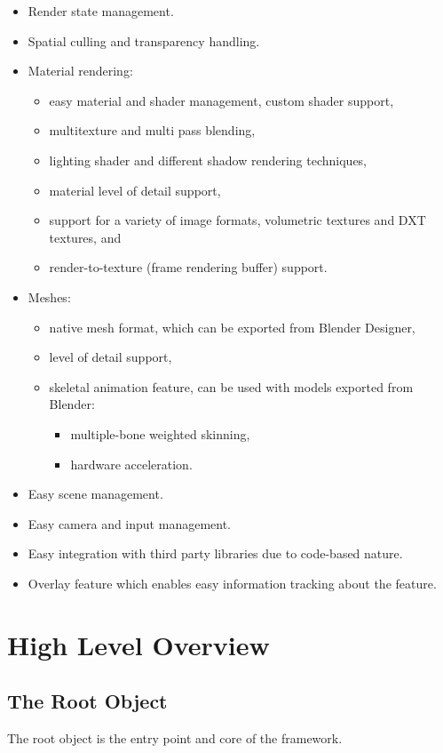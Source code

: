 \begin{itemize}
\item Render state management.
\item Spatial culling and transparency handling.
\item Material rendering:
\begin{itemize}
  \item easy material and shader management, custom shader support,
  \item multitexture and multi pass blending,
  \item lighting shader and different shadow rendering techniques,
  \item material level of detail support,
  \item support for a variety of image formats, volumetric textures and DXT textures, and
  \item render-to-texture (frame rendering buffer) support.
\end{itemize}
\item Meshes:
\begin{itemize}
  \item native mesh format, which can be exported from Blender Designer,
  \item level of detail support,
  \item skeletal animation feature, can be used with models exported from Blender:
\begin{itemize}
  \item multiple-bone weighted skinning, 
  \item hardware acceleration.
\end{itemize}
\end{itemize}
\item Easy scene management.
\item Easy camera and input management.
\item Easy integration with third party libraries due to code-based nature.
\item Overlay feature which enables easy information tracking about the feature.
\end{itemize}

\section{High Level Overview}
\subsection{The Root Object}
The root object is the entry point and core of the framework.

